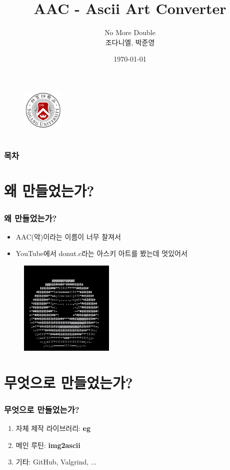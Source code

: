\documentclass{beamer}
\title{AAC - Ascii Art Converter}
\author{No More Double \\ 조다니엘, 박준영}
\date{\today}
\institute{Sogang University \\ CSE2035/AIE2051}
\newcommand{\eg}{\textbf{eg}}
\newcommand{\imgascii}{\textbf{img2ascii}}
\begin{document}
\section{}
\begin{frame}{}
	\titlepage
	\begin{figure}
		\vspace{-1em}
		\includegraphics[width=2cm]{SogangUniversityLogo}
		\vspace{1em}
	\end{figure}
\end{frame}

\section{}
\begin{frame}{}
	\frametitle{목차}
	\tableofcontents
\end{frame}

\section{왜 만들었는가?}
\begin{frame}{}
	\frametitle{왜 만들었는가?}
	\begin{itemize}
		\item AAC(악)이라는 이름이 너무 찰져서
		\item YouTube에서 donut.c라는 아스키 아트를 봤는데 멋있어서\cite{donut}
	\end{itemize}
	\begin{figure}
		\centering
		\includegraphics[width=4.5cm, height=4.5cm]{Donut.png}
	\end{figure}
\end{frame}

\section{무엇으로 만들었는가?}
\begin{frame}{}
	\frametitle{무엇으로 만들었는가?}
	\begin{enumerate}
		\item 자체 제작 라이브러리: \eg
		\item 메인 루틴: \imgascii
		\item 기타: GitHub, Valgrind, ...
	\end{enumerate}
\end{frame}
\end{document}
